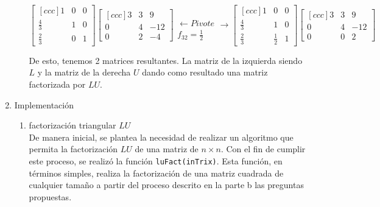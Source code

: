 \documentclass[english,notitlepage,letterpaper, 10pt]{article} %
\begin{document}
\begin{enumerate}
\begin{enumerate}
                \begin{displaymath}
                  \begin{bmatrix}[ccc]
                    1           & 0 & 0 \\
                    \frac{4}{3} & 1 & 0 \\
                    \frac{2}{3} & 0 & 1
                  \end{bmatrix}
                  \begin{bmatrix}[ccc]
                    3 & 3 & 9   \\
                    0 & 4 & -12 \\
                    0 & 2 & -4
                  \end{bmatrix}
                  \begin{matrix}
                    \phantom{taco}    \\
                    \leftarrow Pivote \\
                    f_{32}=\frac{1}{2}
                  \end{matrix}
                  \longrightarrow
                  \begin{bmatrix}[ccc]
                    1           & 0           & 0 \\
                    \frac{4}{3} & 1           & 0 \\
                    \frac{2}{3} & \frac{1}{2} & 1
                  \end{bmatrix}
                  \begin{bmatrix}[ccc]
                    3 & 3 & 9   \\
                    0 & 4 & -12 \\
                    0 & 0 & 2
                  \end{bmatrix}
                \end{displaymath}

                De esto, tenemos 2 matrices resultantes. La matriz de la izquierda siendo $L$ y la matriz de la derecha $U$ dando como resultado una matriz factorizada por $LU$.
        \end{enumerate}

  \item Implementación
        \begin{enumerate}
          \item factorización triangular $LU$ \\
            De manera inicial, se plantea la necesidad de realizar un algoritmo que permita la factorización $LU$ de una matriz de $n \times n$. Con el fin de cumplir este proceso, se realizó la función \texttt{luFact(inTrix)}. Esta función, en términos simples, realiza la factorización de una matriz cuadrada de cualquier tamaño a partir del proceso descrito en la parte b las preguntas propuestas.


\end{enumerate}
\end{enumerate}
\end{document}
